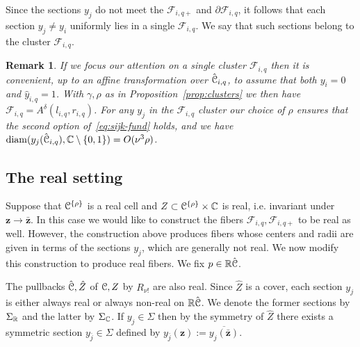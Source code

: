 \documentclass[reqno]{amsart}
\newtheorem{Rem}[Cor]{Remark}{\scshape}{\rmfamily}
\renewcommand\~[1]{\widetilde{#1}}
\def\diam{\operatorname{diam}} \def\ord{\operatorname{ord}}
\def\cF{{\mathcal F}} \def\cL{{\mathcal L}} \def\cR{{\mathcal R}}
\def\vz{{\mathbf z}}
\def\he#1{{\{#1\}}}
\def\hrho{{\he\rho}}
\begin{document}
Since the sections $y_j$ do not meet the $\cF_{i,q+}$ and
$\partial\cF_{i,q}$, it follows that each section $y_j\neq y_i$
uniformly lies in a single $\cF_{i,q}$. We say that such sections
belong to the cluster $\cF_{i,q}$.

\begin{Rem}\label{rem:single-cluster}
  If we focus our attention on a single cluster $\cF_{i,q}$ then it is
  convenient, up to an affine transformation over $\hat{{\mathcal C}}_{i,q}$, to
  assume that both $y_i=0$ and $\hat y_{i,q}=1$. With $\gamma,\rho$ as
  in Proposition~\ref{prop:clusters} we then have
  $\cF_{i,q}=A^\delta(l_{i,q},r_{i,q})$. For any $y_j$ in the
  $\cF_{i,q}$ cluster our choice of $\rho$ ensures that the second
  option of~\eqref{eq:sijk-fund} holds, and we have
  $\diam(y_j(\hat\cC_{i,q}),\C\setminus\{0,1\})=O(\nu^3\rho)$.
\end{Rem}

\subsection{The real setting}
\label{sec:cover-clustering-real}

Suppose that $\cC^\hrho$ is a real cell and
$Z\subset\cC^\hrho\times\C$ is real, i.e. invariant under
$\vz\to\bar\vz$. In this case we would like to construct the fibers
$\cF_{i,q},\cF_{i,q+}$ to be real as well. However, the construction
above produces fibers whose centers and radii are given in terms of
the sections $y_j$, which are generally not real. We now modify this
construction to produce real fibers. We fix $p\in{\mathbb R}\hat{{\mathcal C}}$.

The pullbacks $\hat{{\mathcal C}},\hat Z$ of ${\mathcal C},Z$ by $R_{\nu!}$ are also
real. Since $\hat Z$ is a cover, each section $y_j$ is
either always real or always non-real on ${\mathbb R}\hat{{\mathcal C}}$. We denote the
former sections by $\Sigma_{\mathbb R}$ and the latter by $\Sigma_{\mathbb C}$. If
$y_j\in\Sigma$ then by the symmetry of $\hat Z$ there exists a
symmetric section $y_{\bar j}\in\Sigma$ defined by
$y_{\bar j}(\vz):=\overline{y_j(\bar\vz)}$.
\end{document}
